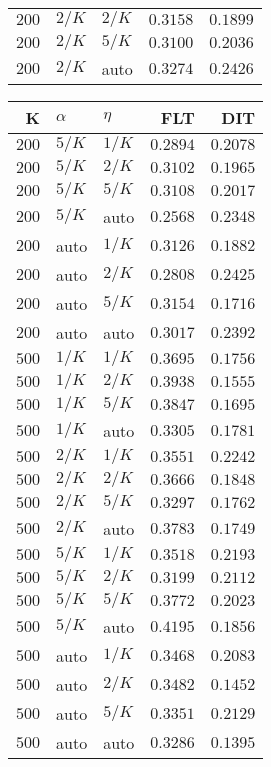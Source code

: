 \begin{table}
\begin{spacing}{1.2}
{\begin{tabular}{rll|rr}
$200$ &  $2/K$ &  $2/K$ &         $0.3158$ &      $0.1899$ \\
$200$ &  $2/K$ &  $5/K$ &         $0.3100$ &      $0.2036$ \\
$200$ &  $2/K$ &   auto &         $0.3274$ & $\bm{0.2426}$ \\
\bottomrule
\end{tabular}
} \hfill \parbox{.45\linewidth}{\centering \begin{tabular}{rll|rr}
\toprule
    K &  $\alpha$ &    $\eta$ & FLT &   DIT \\
\midrule
$200$ &  $5/K$ &  $1/K$ &         $0.2894$ & $0.2078$ \\
$200$ &  $5/K$ &  $2/K$ &         $0.3102$ & $0.1965$ \\
$200$ &  $5/K$ &  $5/K$ &         $0.3108$ & $0.2017$ \\
$200$ &  $5/K$ &   auto &         $0.2568$ & $0.2348$ \\
$200$ &   auto &  $1/K$ &         $0.3126$ & $0.1882$ \\
$200$ &   auto &  $2/K$ &         $0.2808$ & $0.2425$ \\
$200$ &   auto &  $5/K$ &         $0.3154$ & $0.1716$ \\
$200$ &   auto &   auto &         $0.3017$ & $0.2392$ \\
$500$ &  $1/K$ &  $1/K$ &         $0.3695$ & $0.1756$ \\
$500$ &  $1/K$ &  $2/K$ &         $0.3938$ & $0.1555$ \\
$500$ &  $1/K$ &  $5/K$ &         $0.3847$ & $0.1695$ \\
$500$ &  $1/K$ &   auto &         $0.3305$ & $0.1781$ \\
$500$ &  $2/K$ &  $1/K$ &         $0.3551$ & $0.2242$ \\
$500$ &  $2/K$ &  $2/K$ &         $0.3666$ & $0.1848$ \\
$500$ &  $2/K$ &  $5/K$ &         $0.3297$ & $0.1762$ \\
$500$ &  $2/K$ &   auto &         $0.3783$ & $0.1749$ \\
$500$ &  $5/K$ &  $1/K$ &         $0.3518$ & $0.2193$ \\
$500$ &  $5/K$ &  $2/K$ &         $0.3199$ & $0.2112$ \\
$500$ &  $5/K$ &  $5/K$ &         $0.3772$ & $0.2023$ \\
$500$ &  $5/K$ &   auto &    $\bm{0.4195}$ & $0.1856$ \\
$500$ &   auto &  $1/K$ &         $0.3468$ & $0.2083$ \\
$500$ &   auto &  $2/K$ &         $0.3482$ & $0.1452$ \\
$500$ &   auto &  $5/K$ &         $0.3351$ & $0.2129$ \\
$500$ &   auto &   auto &         $0.3286$ & $0.1395$ \\
\bottomrule
\end{tabular}
}
\end{spacing}
\end{table}
